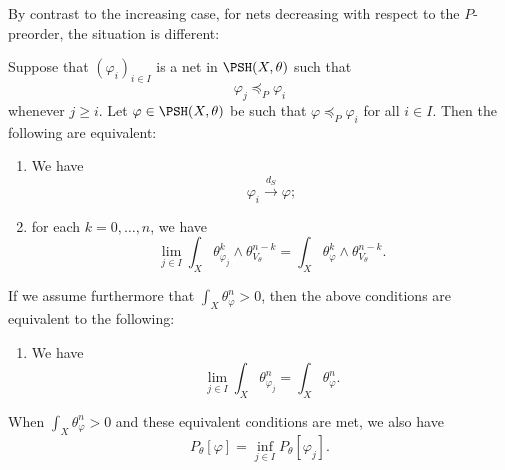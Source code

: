 By contrast to the increasing case, for nets decreasing with respect to the $P$-preorder, the situation is different:
\begin{corollary}\label{cor:decnetdS}
    Suppose that $(\varphi_i)_{i\in I}$ is a net in $\PSH(X,\theta)$ such that
    \[
        \varphi_j\preceq_P\varphi_i
    \]
    whenever $j\geq i$. Let $\varphi\in\PSH(X,\theta)$ be such that $\varphi\preceq_P\varphi_i$ for all $i\in I$. Then the following are equivalent:
    \begin{enumerate}
        \item\label{itm:cor:decnetdS:1} We have
            \[
                \varphi_i\xrightarrow{d_S} \varphi;
            \]
        \item\label{itm:cor:decnetdS:2} for each $k=0,\ldots,n$, we have
            \begin{equation}\label{eq:mixedmasslim}
                \lim_{j\in I}\int_X \theta_{\varphi_j}^k\wedge \theta_{V_{\theta}}^{n-k} =  \int_X \theta_{\varphi}^k\wedge \theta_{V_{\theta}}^{n-k}.
            \end{equation}
    \end{enumerate}
    If we assume furthermore that $\int_X \theta_{\varphi}^n>0$, then the above conditions are equivalent to the following:
    \begin{enumerate}[resume]
        \item\label{itm:cor:decnetdS:3} We have
            \[
                \lim_{j\in I}\int_X \theta_{\varphi_j}^n=\int_X \theta_{\varphi}^n.
            \]
    \end{enumerate}
    When $\int_X \theta_{\varphi}^n>0$ and these equivalent conditions are met, we also have
    \begin{equation}\label{eq:Pcontdecseq}
        P_{\theta}[\varphi]=\inf_{j\in I}P_{\theta}[\varphi_j].
    \end{equation}
\end{corollary}
